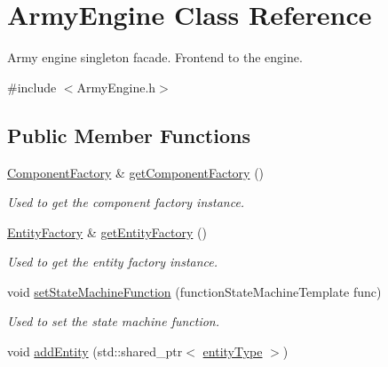 \hypertarget{class_army_engine}{\section{Army\-Engine Class Reference}
\label{d4/d9d/class_army_engine}
}


Army engine singleton facade. Frontend to the engine.  




{\ttfamily \#include $<$Army\-Engine.\-h$>$}

\subsection*{Public Member Functions}
\begin{DoxyCompactItemize}
\item 
\hypertarget{class_army_engine_a3dd8d3d4995bf02ca28664f197bac5f5}{\hyperlink{class_component_factory}{Component\-Factory} \& \hyperlink{class_army_engine_a3dd8d3d4995bf02ca28664f197bac5f5}{get\-Component\-Factory} ()}\label{d4/d9d/class_army_engine_a3dd8d3d4995bf02ca28664f197bac5f5}

\begin{DoxyCompactList}\small\item\em Used to get the component factory instance. \end{DoxyCompactList}\item 
\hypertarget{class_army_engine_ad7376a61473a6c71e2da08694349bf23}{\hyperlink{class_entity_factory}{Entity\-Factory} \& \hyperlink{class_army_engine_ad7376a61473a6c71e2da08694349bf23}{get\-Entity\-Factory} ()}\label{d4/d9d/class_army_engine_ad7376a61473a6c71e2da08694349bf23}

\begin{DoxyCompactList}\small\item\em Used to get the entity factory instance. \end{DoxyCompactList}\item 
\hypertarget{class_army_engine_a0c06643415c132f8db70339c37ec9488}{void \hyperlink{class_army_engine_a0c06643415c132f8db70339c37ec9488}{set\-State\-Machine\-Function} (function\-State\-Machine\-Template func)}\label{d4/d9d/class_army_engine_a0c06643415c132f8db70339c37ec9488}

\begin{DoxyCompactList}\small\item\em Used to set the state machine function. \end{DoxyCompactList}\item 
\hypertarget{class_army_engine_a095705b23a31c1356b2ebb3b227dd142}{void \hyperlink{class_army_engine_a095705b23a31c1356b2ebb3b227dd142}{add\-Entity} (std\-::shared\-\_\-ptr$<$ \hyperlink{_abstract_entity_8h_a5b087f4ada5a2395ba03ae7d01b56568}{entity\-Type} $>$)}\label{d4/d9d/class_army_engine_a095705b23a31c1356b2ebb3b227dd142}


\end{DoxyCompactItemize}
